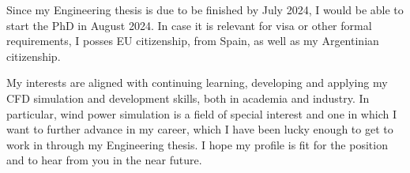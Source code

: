 \documentclass{letter}
\newcommand{\thesisname}{Parametric analysis of actuator disks models to simulate wind farms}
\begin{document}
\begin{letter}{}
Since my Engineering thesis is due to be finished by July 2024, I would be able to start the PhD in August 2024.
  In case it is relevant for visa or other formal requirements, I posses EU citizenship, from Spain, as well as my Argentinian citizenship.

  My interests are aligned with continuing learning, developing and applying my CFD simulation and development skills, both in academia and industry.
  In particular, wind power simulation is a field of special interest and one in which I want to further advance in my career, which I have been lucky enough to get to work in through my Engineering thesis.
  I hope my profile is fit for the position and to hear from you in the near future.




\end{letter}
\end{document}
